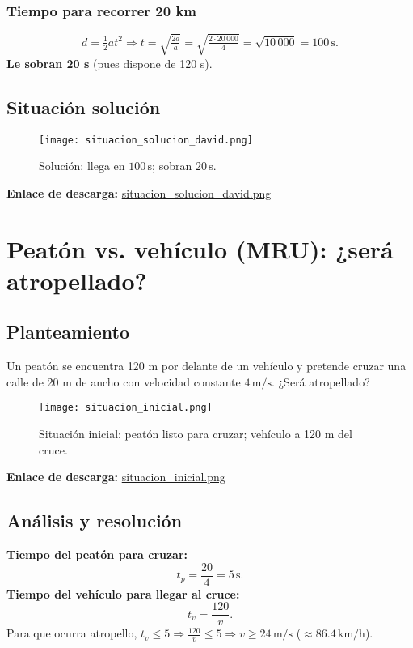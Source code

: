 \documentclass[12pt,a4paper,openany]{book} %
\begin{document}
\subsection{Tiempo para recorrer 20 km}
\[
d=\tfrac{1}{2} a t^2 \Rightarrow t=\sqrt{\tfrac{2d}{a}}
=\sqrt{\tfrac{2\cdot 20\,000}{4}}=\sqrt{10\,000}=100\,\text{s}.
\]
\textbf{Le sobran 20 s} (pues dispone de 120 s).

\section{Situación solución}
\begin{figure}[h!]
  \centering
  \texttt{[image: situacion\_solucion\_david.png]}
  \caption{Solución: llega en \(100\,\text{s}\); sobran \(20\,\text{s}\).}
\end{figure}
\noindent\textbf{Enlace de descarga:} \href{run:imagenes/situacion_solucion_david.png}{situacion\_solucion\_david.png}

\chapter{Peatón vs. vehículo (MRU): ¿será atropellado?}

\section{Planteamiento}
Un peatón se encuentra 120 m por delante de un vehículo y pretende cruzar una calle de 20 m de ancho con velocidad constante \(4\,\text{m/s}\). ¿Será atropellado?

\begin{figure}[h!]
  \centering
  \texttt{[image: situacion\_inicial.png]}
  \caption{Situación inicial: peatón listo para cruzar; vehículo a 120 m del cruce.}
\end{figure}
\noindent\textbf{Enlace de descarga:} \href{run:imagenes/situacion_inicial.png}{situacion\_inicial.png}

\section{Análisis y resolución}
\textbf{Tiempo del peatón para cruzar:}
\[
t_p=\frac{20}{4}=5\,\text{s}.
\]
\textbf{Tiempo del vehículo para llegar al cruce:}
\[
t_v=\frac{120}{v}.
\]
Para que ocurra atropello, \(t_v\le 5\Rightarrow \frac{120}{v}\le 5 \Rightarrow v\ge 24\,\text{m/s}\) (\(\approx 86.4\,\text{km/h}\)).
\end{document}
